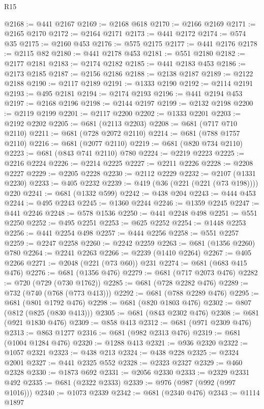 \begin{lexlean}{R15}
\begin{coremodule}
@2168 := @441 @2167
@2169 := @2168 @618
@2170 := @2166 @2169
@2171 := @2165 @2170
@2172 := @2164 @2171
@2173 := @441 @2172
@2174 := @574 @35
@2175 := @2160 @453
@2176 := @575 @2175
@2177 := @441 @2176
@2178 := @2115 @82
@2180 := @441 @2178 @453
@2181 := @551 @2180
@2182 := @2177 @2181
@2183 := @2174 @2182
@2185 := @441 @2183 @453
@2186 := @2173 @2185
@2187 := @2156 @2186
@2188 := @2138 @2187
@2189 := @2122 @2188
@2190 := @2117 @2189
@2191 := @1333 @2190
@2192 := @2114 @2191
@2193 := @495 @2181
@2194 := @2174 @2193
@2196 := @441 @2194 @453
@2197 := @2168 @2196
@2198 := @2144 @2197
@2199 := @2132 @2198
@2200 := @2119 @2199
@2201 := @2117 @2200
@2202 := @1333 @2201
@2203 := @2192 @2202
@2205 := @681 (@2113 @2203)
@2208 := @681 (@717 @710 @2110)
@2211 := @681 (@728 @2072 @2110)
@2214 := @681 (@788 @1757 @2110)
@2216 := @681 (@2077 @2110)
@2219 := @681 (@820 @734 @2110)
@2223 := @681 (@843 @741 @2110) @780
@2224 := @2219 @2223
@2225 := @2216 @2224
@2226 := @2214 @2225
@2227 := @2211 @2226
@2228 := @2208 @2227
@2229 := @2205 @2228
@2230 := @2112 @2229
@2232 := @2107 (@1331 @2230)
@2233 := @405 @2232
@2239 := @419 (@36 (@221 (@221 (@73 @198)))) @220
@2241 := @681 (@1332 @599)
@2242 := @438 @204
@2243 := @444 @453
@2244 := @495 @2243
@2245 := @1360 @2244
@2246 := @1359 @2245
@2247 := @441 @2246
@2248 := @578 @1536
@2250 := @441 @2248 @498
@2251 := @551 @2250
@2252 := @495 @2251
@2253 := @625 @2252
@2254 := @1448 @2253
@2256 := @441 @2254 @498
@2257 := @444 @2256
@2258 := @551 @2257
@2259 := @2247 @2258
@2260 := @2242 @2259
@2263 := @681 (@1356 @2260) @780
@2264 := @2241 @2263
@2266 := @2239 (@1410 @2264)
@2267 := @405 @2266
@2271 := @2048 (@221 (@73 @60)) @231
@2274 := @681 (@683 @415 @476)
@2276 := @681 (@1356 @476)
@2279 := @681 (@717 @2073 @476)
@2282 := @720 (@729 (@730 @1762))
@2285 := @681 (@728 @2282 @476)
@2289 := @732 (@740 (@768 (@773 @413)))
@2292 := @681 (@788 @2289 @476)
@2295 := @681 (@801 @1792 @476)
@2298 := @681 (@820 @1803 @476)
@2302 := @807 (@812 (@825 (@830 @413)))
@2305 := @681 (@843 @2302 @476)
@2308 := @681 (@921 @1830 @476)
@2309 := @858 @413
@2312 := @681 (@971 @2309 @476)
@2313 := @863 @1277
@2316 := @681 (@982 @2313 @476)
@2319 := @681 (@1004 @1284 @476)
@2320 := @1288 @413
@2321 := @936 @2320
@2322 := @1057 @2321
@2323 := @438 @213
@2324 := @438 @228
@2325 := @2324 @2001
@2327 := @441 @2325 @552
@2328 := @2323 @2327
@2329 := @460 @2328
@2330 := @1873 @692
@2331 := @2056 @2330
@2333 := @2329 @2331 @492
@2335 := @681 (@2322 @2333)
@2339 := @976 (@987 (@992 (@997 @1016)))
@2340 := @1073 @2339
@2342 := @681 (@2340 @476)
@2343 := @1114 @1897

\end{coremodule}
\end{lexlean}
